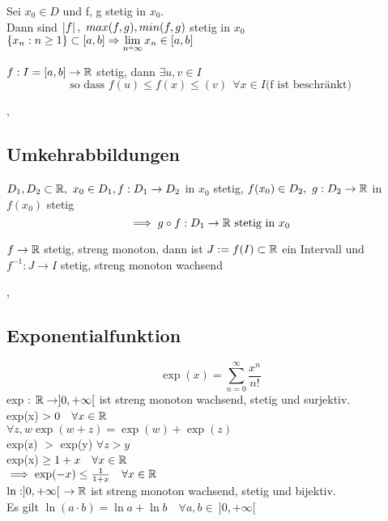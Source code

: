 \Lemma[3.4.3] Sei $x_0 \in D$ und f, g stetig in $x_0$. \\
Dann sind $\left\lvert f \right\rvert, \ max(f, g), min(f, g)$ stetig in $x_0$ \\

\Lemma[3.4.4] $\{x_n : n \geq 1\} \subset [a, b] \Rightarrow  \lim\limits_{n \veryshortarrow \infty} x_n \in [a, b]$

\Satz[3.4.5] $f: I =  [a, b] \rightarrow \mathbb{R}$ stetig, dann $\exists u, v \in I$
\[ \text{so dass } f(u) \leq f(x) \leq(v) \ \ \forall x \in I \text{(f ist beschränkt)} \]

\sep

\subsection{Umkehrabbildungen}

\Satz[3.5.1] $D_1, D_2 \subset \mathbb{R}, \ x_0 \in D_1, f : D_1 \rightarrow D_2$ in $x_0$ stetig, $f(x_0) \in D_2, \ g : D_2 \rightarrow \mathbb{R}$ in $f(x_0)$ stetig
\[ \implies g \circ f : D_1 \rightarrow \mathbb{R}  \text{ stetig in } x_0 \] 

\Satz[3.5.3]$f \rightarrow \mathbb{R}$ stetig, streng monoton, dann ist $J := f(I) \subset \mathbb{R}$ ein Intervall und $f^{-1} : J \rightarrow I$ stetig, streng monoton wachsend

\sep

\subsection{Exponentialfunktion}
\[ \exp(x) = \sum_{n=0}^\infty \frac{x^n}{n!} \]
\Satz[3.6.1] exp : $\mathbb{R} \rightarrow ]0, + \infty[$ ist streng monoton wachsend, stetig und surjektiv. \\

\Korollar[3.6.2] exp(x) $> 0 \quad \forall x \in \mathbb{R}$ \\

\Bsp[2.7.27] $\forall z, w  \exp(w + z) = \exp(w) + \exp(z)$\\

\Korollar[3.6.3] exp(z) $>$ exp(y) $\forall z > y$\\

\Korollar[3.6.4] exp(x) $\geq  1 + x \quad \forall x \in \mathbb{R}$ \\
 $ \implies \exp(-x) \leq \frac{1}{1+x} \quad \forall x \in \mathbb{R}$ \\

\Korollar[3.6.5] $ \ln : ]0, + \infty[ \ \rightarrow \mathbb{R}$ ist streng monoton wachsend, stetig und bijektiv. \\
Es gilt \( \ln(a \cdot b) = \ln a + \ln b \quad \forall a, b \in \ ]0, +\infty[ \)

